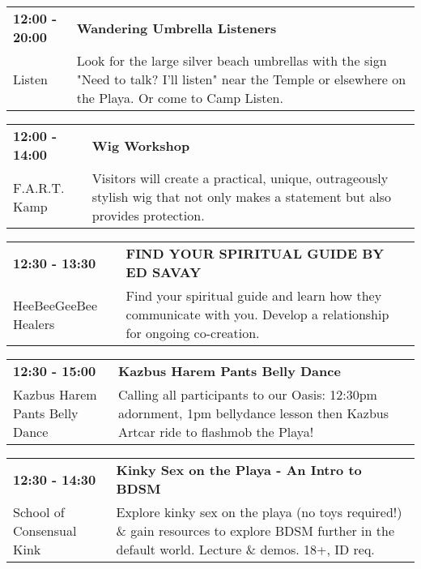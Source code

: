 \begin{tabular}{ p{1in} p{2.2in} }
    \textbf{12:00 - 20:00} & \textbf{Wandering Umbrella Listeners} \\
    Listen \newline  & Look for the large silver beach umbrellas with the sign "Need to talk? I'll listen" near the Temple or elsewhere on the Playa. Or come to Camp Listen. \\
    \hline 
\end{tabular}
    
\begin{tabular}{ p{1in} p{2.2in} }
    \textbf{12:00 - 14:00} & \textbf{Wig Workshop} \\
    F.A.R.T. Kamp \newline  & Visitors will create a practical, unique, outrageously stylish wig that not only makes a statement but also provides protection. \\
    \hline 
\end{tabular}
    
\begin{tabular}{ p{1in} p{2.2in} }
    \textbf{12:30 - 13:30} & \textbf{FIND YOUR SPIRITUAL GUIDE BY ED SAVAY} \\
    HeeBeeGeeBee Healers \newline  & Find your spiritual guide and learn how they communicate with you.  Develop a relationship for ongoing co-creation. \\
    \hline 
\end{tabular}
    
\begin{tabular}{ p{1in} p{2.2in} }
    \textbf{12:30 - 15:00} & \textbf{Kazbus Harem Pants Belly Dance} \\
    Kazbus Harem Pants Belly Dance \newline  & Calling all participants to our Oasis: 12:30pm adornment, 1pm bellydance lesson then Kazbus Artcar ride to flashmob the Playa! \\
    \hline 
\end{tabular}
    
\begin{tabular}{ p{1in} p{2.2in} }
    \textbf{12:30 - 14:30} & \textbf{Kinky Sex on the Playa - An Intro to BDSM} \\
    School of Consensual Kink \newline  & Explore kinky sex on the playa (no toys required!) \& gain resources to explore BDSM further in the default world. Lecture \& demos. 18+, ID req. \\
    \hline 
\end{tabular}
    
